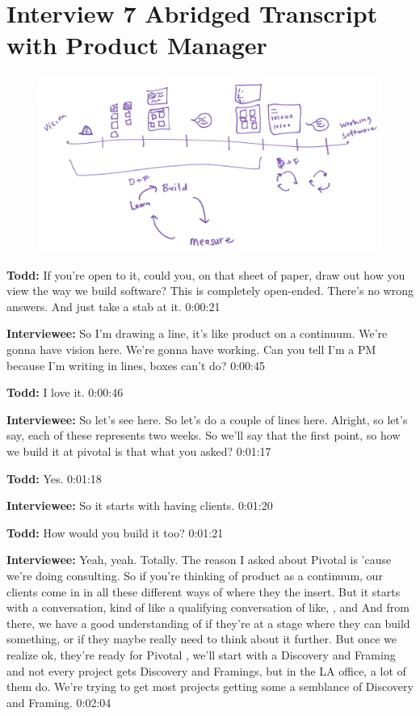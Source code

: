 \section{Interview 7 Abridged Transcript with Product Manager }

\begin{figure}[h]
\centering
\includegraphics[width=6.5in]{interviews/drawings/2015_08_12_pm.png}
\caption{}
\label{2015_08_12_pm}
\end{figure}


\textbf{Todd:} If you're open to it, could you, on that sheet of paper, draw out how you view the way we build software? This is completely open-ended. There's no wrong answers. And just take a stab at it.  0:00:21

\textbf{Interviewee:} So I'm drawing a line, it's like product on a continuum. We're gonna have vision here. We're gonna have working. Can you tell I'm a PM because I'm writing in lines, boxes can't do? 0:00:45

\textbf{Todd:} I love it.  0:00:46

\textbf{Interviewee:} So let's see here. So let's do a couple of lines here. Alright, so let's say, each of these represents two weeks.  So we'll say that the first point, so how we build it at pivotal is that what you asked?  0:01:17

\textbf{Todd:} Yes.  0:01:18

\textbf{Interviewee:} So it starts with having clients.  0:01:20

\textbf{Todd:} How would you build it too?  0:01:21

\textbf{Interviewee:} Yeah, yeah. Totally. The reason I asked about Pivotal is 'cause we're doing consulting. So if you're thinking of product as a continuum, our clients come in in all these different ways of where they the insert. But it starts with a conversation, kind of like a qualifying conversation of like, , and  And from there, we have a good understanding of if they're at a stage where they can build something, or if they maybe really need to think about it further.  But once we realize ok, they're ready for Pivotal , we'll start with a Discovery and Framing and not every project gets Discovery and Framings, but in the LA office, a lot of them do.  We're trying to get most projects getting some a semblance of Discovery and Framing.   0:02:04

